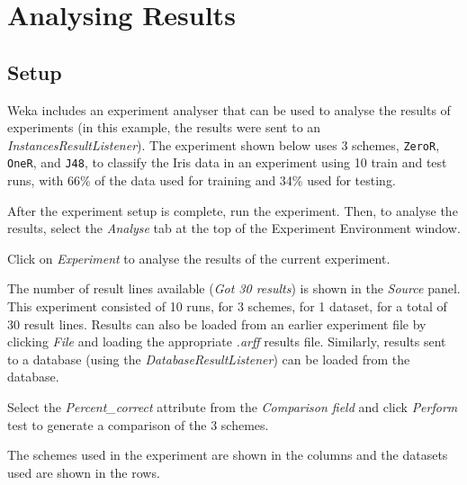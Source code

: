 
\newpage
\section{Analysing Results}

\subsection{Setup}

Weka includes an experiment analyser that can be used to analyse the results of experiments (in this example, the results were sent to an \textit{InstancesResultListener}). The experiment shown below uses 3 schemes, \texttt{ZeroR}, \texttt{OneR}, and \texttt{J48}, to classify the Iris data in an experiment using 10 train and test runs, with 66\% of the data used for training and 34\% used for testing.
\begin{center}
\end{center}

After the experiment setup is complete, run the experiment. Then, to analyse the results, select the \textit{Analyse} tab at the top of the Experiment Environment window.

Click on \textit{Experiment} to analyse the results of the current experiment.
\begin{center}
\end{center}

The number of result lines available (\textit{Got 30 results}) is shown in the \textit{Source} panel. This experiment consisted of 10 runs, for 3 schemes, for 1 dataset, for a total of 30 result lines. Results can also be loaded from an earlier experiment file by clicking \textit{File} and loading the appropriate \textit{.arff} results file. Similarly, results sent to a database (using the \textit{DatabaseResultListener}) can be loaded from the database.

Select the \textit{Percent\_correct} attribute from the \textit{Comparison field} and click \textit{Perform} test to generate a comparison of the 3 schemes.
\begin{center}
\end{center}

The schemes used in the experiment are shown in the columns and the datasets used are shown in the rows.

